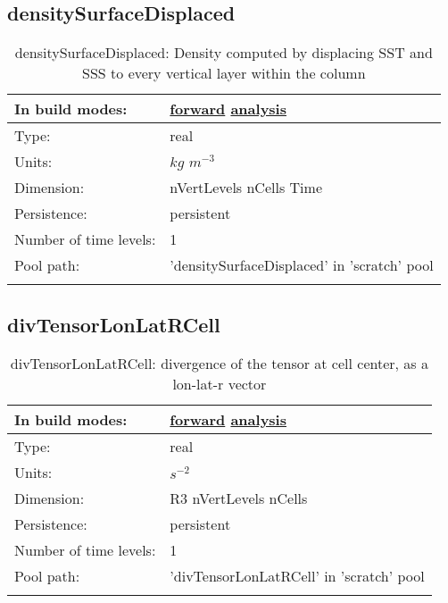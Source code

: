 \subsection[densitySurfaceDisplaced]{densitySurfaceDisplaced}
\label{subsec:var_sec_scratch_densitySurfaceDisplaced}
\begin{center}
\begin{longtable}{| p{2.0in} | p{4.0in} |}
        \hline 
        In build modes: & \hyperref[subsec:forward_var_tab_scratch]{forward} \hyperref[subsec:analysis_var_tab_scratch]{analysis} \\
        \hline 
        Type: & real \\
        \hline 
        Units: & $kg$ $m^{-3}$ \\
        \hline 
        Dimension: & nVertLevels nCells Time \\
        \hline 
        Persistence: & persistent \\
        \hline 
        Number of time levels: & 1 \\
        \hline 
            Pool path: & 'densitySurfaceDisplaced' in 'scratch' pool
 \\
		 \hline 
    \caption{densitySurfaceDisplaced: Density computed by displacing SST and SSS to every vertical layer within the column}
\end{longtable}
\end{center}
\subsection[divTensorLonLatRCell]{divTensorLonLatRCell}
\label{subsec:var_sec_scratch_divTensorLonLatRCell}
\begin{center}
\begin{longtable}{| p{2.0in} | p{4.0in} |}
        \hline 
        In build modes: & \hyperref[subsec:forward_var_tab_scratch]{forward} \hyperref[subsec:analysis_var_tab_scratch]{analysis} \\
        \hline 
        Type: & real \\
        \hline 
        Units: & $s^{-2}$ \\
        \hline 
        Dimension: & R3 nVertLevels nCells \\
        \hline 
        Persistence: & persistent \\
        \hline 
        Number of time levels: & 1 \\
        \hline 
            Pool path: & 'divTensorLonLatRCell' in 'scratch' pool
 \\
		 \hline 
    \caption{divTensorLonLatRCell: divergence of the tensor at cell center, as a lon-lat-r vector}
\end{longtable}
\end{center}

